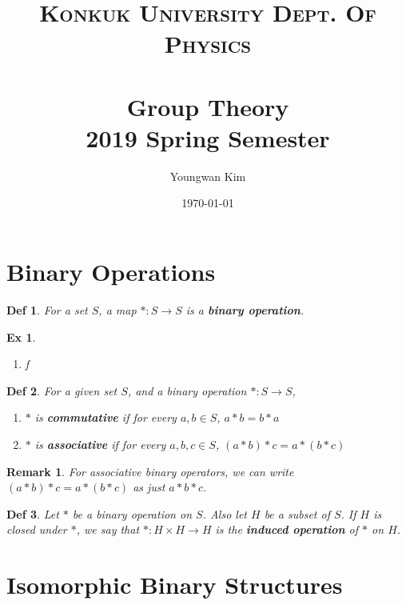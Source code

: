 \documentclass[paper=a4, fontsize=11pt]{scrartcl}
\title{	
	\normalfont \normalsize 
	\textsc{Konkuk University Dept. Of Physics} \\ [25pt] %
	\horrule{1pt} \\[0.4cm] 
	\huge Group Theory \\
	\vspace{0.1in}
	\Large 2019 Spring Semester
	\horrule{1pt} \\[0.4cm] 
}
\author{Youngwan Kim}
\date{\normalsize\today}
\newtheorem{definition}{Def}
\newtheorem{example}{Ex}
\newtheorem*{remark}{Remark}
\begin{document}
	
\maketitle	

\section{Binary Operations}
\vspace{0.25in}

\begin{definition}
	For a set $S$, a map $\ast : S \to S$ is a \textbf{binary operation}. \\
\end{definition}

\begin{example}
$ $ \newline
\vspace{-0.15in}
\begin{enumerate}
	\item f \\
\end{enumerate}
\end{example}

\begin{definition}
	For a given set $S$, and a binary operation $\ast : S \to S$,
	\begin{enumerate}
		\item $\ast$ is \textbf{commutative} if for every $a,b \in S$, $a \ast b = b \ast a$
		\item $\ast$ is \textbf{associative} if for every $a,b,c \in S$, $(a \ast b) \ast c = a \ast ( b\ast c)$ \\
	\end{enumerate}
\end{definition}

\begin{remark}
	For associative binary operators, we can write $(a \ast b) \ast c = a \ast ( b\ast c)$ as just $a \ast b \ast c$. \\
\end{remark}

\begin{definition}
	Let $\ast$ be a binary operation on $S$. Also let $H$ be a subset of $S$. If $H$ is closed under $\ast$, we say that $\ast : H \times H \to H$ is the \textbf{induced operation} of $\ast$ on $H$.\\
\end{definition}


\section{Isomorphic Binary Structures}
\vspace{0.25in}
\end{document}
